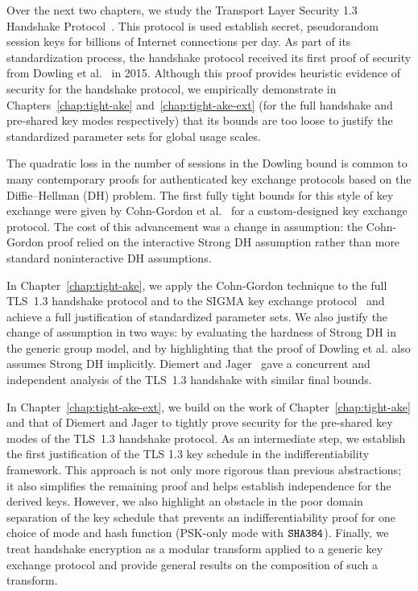 
Over the next two chapters, we study the Transport Layer Security 1.3 Handshake Protocol~\cite{rfc8446}. This protocol is used establish secret, pseudorandom session keys for billions of Internet connections per day. As part of its standardization process, the handshake protocol received its first proof of security from Dowling et al.~\cite{CCS:DFGS15} in 2015. Although this proof provides heuristic evidence of security for the handshake protocol, we empirically demonstrate in Chapters~\ref{chap:tight-ake} and~\ref{chap:tight-ake-ext} (for the full handshake and pre-shared key modes respectively) that its bounds are too loose to justify the standardized parameter sets for global usage scales.

The quadratic loss in the number of sessions in the Dowling bound is common to many contemporary proofs for authenticated key exchange protocols based on the Diffie--Hellman (DH) problem. The first fully tight bounds for this style of key exchange were given by Cohn-Gordon et al.~\cite{C:CCGJJ19} for a custom-designed key exchange protocol. The cost of this advancement was a change in assumption: the Cohn-Gordon proof relied on the interactive Strong DH assumption rather than more standard noninteractive DH assumptions. 

In Chapter~\ref{chap:tight-ake}, we apply the Cohn-Gordon technique to the full TLS~1.3 handshake protocol and to the SIGMA key exchange protocol~\cite{C:Krawczyk03} and achieve a full justification of standardized parameter sets. We also justify the change of assumption in two ways: by evaluating the hardness of Strong DH in the generic group model, and by highlighting that the proof of Dowling et al. also assumes Strong DH implicitly. Diemert and Jager~\cite{JC:DieJag20} gave a concurrent and independent analysis of the TLS~1.3 handshake with similar final bounds.

In Chapter~\ref{chap:tight-ake-ext}, we build on the work of Chapter~\ref{chap:tight-ake} and that of Diemert and Jager to tightly prove security for the pre-shared key modes of the TLS~1.3 handshake protocol. As an intermediate step, we establish the first justification of the TLS 1.3 key schedule in the indifferentiability framework. This approach is not only more rigorous than previous abstractions; it also simplifies the remaining proof and helps establish independence for the derived keys. However, we also highlight an obstacle in the poor domain separation of the key schedule that prevents an indifferentiability proof for one choice of mode and hash function (PSK-only mode with $\texttt{SHA{384}}$). Finally, we treat handshake encryption as a modular transform applied to a generic key exchange protocol and provide general results on the composition of such a transform.

